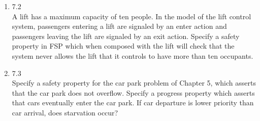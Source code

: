 \documentclass{article}
\begin{document}
\begin{enumerate}
\begin{enumerate}
  \item 7.2 \\
   A lift has a maximum capacity of ten people. In the model of the lift control system, passengers entering a lift are signaled by an enter action and passengers leaving the lift are signaled by an exit action. Specify a safety property in FSP which when composed with the lift will check that the system never allows the lift that it controls to have more than ten occupants. \\
  \item 7.3 \\
   Specify a safety property for the car park problem of Chapter 5, which asserts that the car park does not overflow. Specify a progress property which asserts that cars eventually enter the car park. If car departure is lower priority than car arrival, does starvation occur? \\
\end{enumerate}


\end{enumerate}
\end{document}
